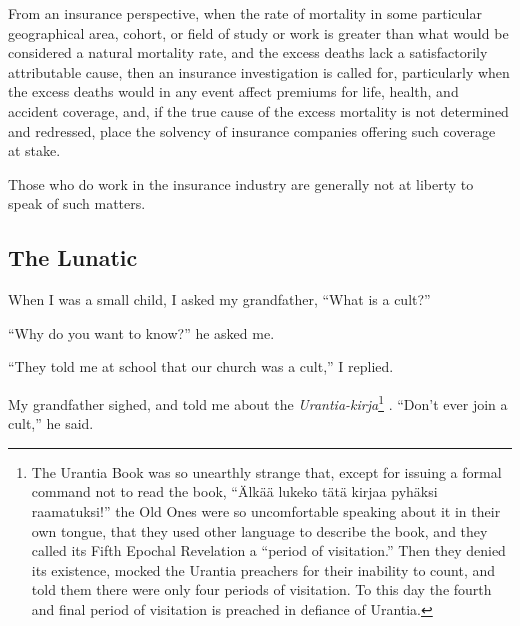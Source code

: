 \documentclass[letterpaper]{article}
\begin{document}
From an insurance perspective, when the rate of mortality in some particular geographical area, cohort, or field of study or work is greater than what would be considered a natural mortality rate, and the excess deaths lack a satisfactorily attributable cause, then an insurance investigation is called for, particularly when the excess deaths would in any event affect premiums for life, health, and accident coverage, and, if the true cause of the excess mortality is not determined and redressed, place the solvency of insurance companies offering such coverage at stake.

Those who do work in the insurance industry are generally not at liberty to speak of such matters.

\subsection{The Lunatic}\label{lunatic}
When I was a small child, I asked my grandfather, ``What is a cult?''

``Why do you want to know?'' he asked me.

``They told me at school that our church was a cult,'' I replied.

My grandfather sighed, and told me about the \foreignlanguage{finnish}{\textit{Urantia-kirja}}\footnote{The Urantia Book was so unearthly strange that, except for issuing a formal command not to read the book, ``\foreignlanguage{finnish}{{\"A}lk{\"a}{\"a} lukeko t{\"a}t{\"a} kirjaa pyh{\"a}ksi raamatuksi!}'' the Old Ones were so uncomfortable speaking about it in their own tongue, that they used other language to describe the book, and they called its Fifth Epochal Revelation a ``period of visitation.''  Then they denied its existence, mocked the Urantia preachers for their inability to count, and told them there were only four periods of visitation. To this day the fourth and final period of visitation is preached in defiance of Urantia.} \cite{urantia-kirja}.  ``Don't ever join a cult,'' he said.
\end{document}
